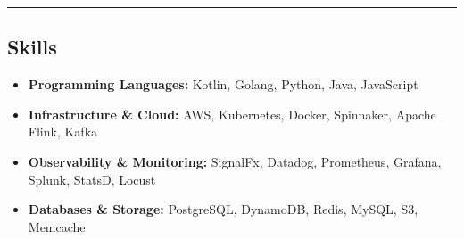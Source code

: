 \documentclass[11pt,letterpaper]{article}
\begin{document}
\hrule
\vspace{-1em}
\subsection*{\Large Skills}

\begin{itemize}[leftmargin=1em,noitemsep]
	\item \textbf{Programming Languages:}
	      Kotlin, Golang, Python, Java, JavaScript
        \item \textbf{Infrastructure \& Cloud:}
            AWS, Kubernetes, Docker, Spinnaker, Apache Flink, Kafka
        \item \textbf{Observability \& Monitoring:}
            SignalFx, Datadog, Prometheus, Grafana, Splunk, StatsD, Locust
        \item \textbf{Databases \& Storage:}
            PostgreSQL, DynamoDB, Redis, MySQL, S3, Memcache
\end{itemize}
\end{document}

